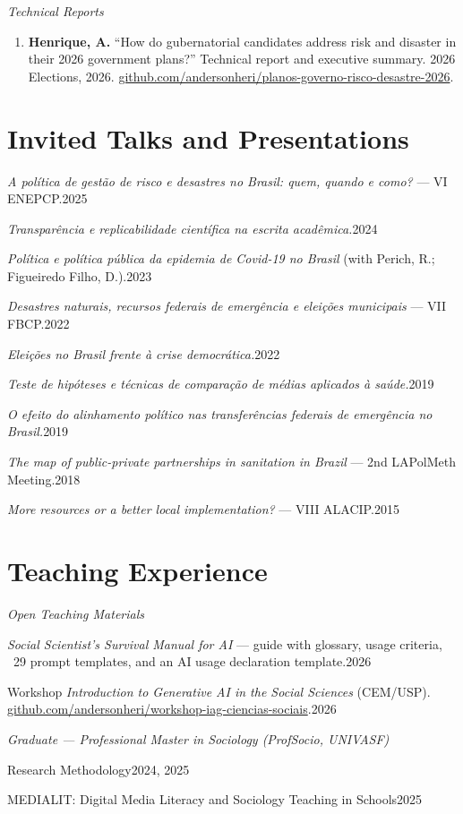 \documentclass[11pt]{article}
\newcommand{\cvsubsection}[1]{\vspace{0.9em}\textit{#1}\par\vspace{0.35em}}
\newcommand{\entryplain}[2]{\noindent#1\hfill #2\par\vspace{0.15em}}
\begin{document}
\cvsubsection{Technical Reports}
\begin{enumerate}[leftmargin=0.3in,itemsep=0.4em,parsep=0pt]
\item \textbf{Henrique, A.} ``How do gubernatorial candidates address risk and disaster in their 2026 government plans?'' Technical report and executive summary. 2026 Elections, 2026. \href{https://github.com/andersonheri/planos-governo-risco-desastre-2026}{github.com/andersonheri/planos-governo-risco-desastre-2026}.
\end{enumerate}

\section{Invited Talks and Presentations}

\entryplain{\textit{A política de gestão de risco e desastres no Brasil: quem, quando e como?} --- VI ENEPCP.}{2025}
\entryplain{\textit{Transparência e replicabilidade científica na escrita acadêmica.}}{2024}
\entryplain{\textit{Política e política pública da epidemia de Covid-19 no Brasil} (with Perich, R.; Figueiredo Filho, D.).}{2023}
\entryplain{\textit{Desastres naturais, recursos federais de emergência e eleições municipais} --- VII FBCP.}{2022}
\entryplain{\textit{Eleições no Brasil frente à crise democrática.}}{2022}
\entryplain{\textit{Teste de hipóteses e técnicas de comparação de médias aplicados à saúde.}}{2019}
\entryplain{\textit{O efeito do alinhamento político nas transferências federais de emergência no Brasil.}}{2019}
\entryplain{\textit{The map of public-private partnerships in sanitation in Brazil} --- 2nd LAPolMeth Meeting.}{2018}
\entryplain{\textit{More resources or a better local implementation?} --- VIII ALACIP.}{2015}

\section{Teaching Experience}

\cvsubsection{Open Teaching Materials}
\entryplain{\textit{Social Scientist's Survival Manual for AI} --- guide with glossary, usage criteria, ~29 prompt templates, and an AI usage declaration template.}{2026}
\entryplain{Workshop \textit{Introduction to Generative AI in the Social Sciences} (CEM/USP). \href{https://github.com/andersonheri/workshop-iag-ciencias-sociais}{github.com/andersonheri/workshop-iag-ciencias-sociais}.}{2026}

\vspace{0.9em}
\cvsubsection{Graduate --- Professional Master in Sociology (ProfSocio, UNIVASF)}
\entryplain{Research Methodology}{2024, 2025}
\entryplain{MEDIALIT: Digital Media Literacy and Sociology Teaching in Schools}{2025}
\end{document}
